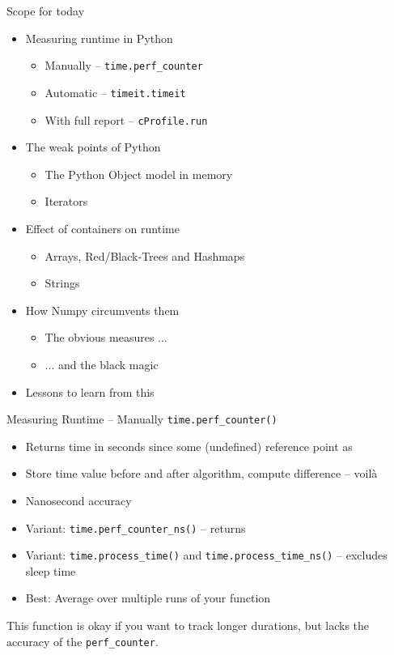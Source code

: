 \begin{frame}{Scope for today}
%
\begin{itemize}
\item Measuring runtime in Python
	\begin{itemize}
	\item Manually -- \texttt{time.perf\_counter}
	\item Automatic -- \texttt{timeit.timeit}
	\item With full report -- \texttt{cProfile.run}
	\end{itemize}
\item The weak points of Python
	\begin{itemize}
	\item The Python Object model in memory
	\item Iterators
	\end{itemize}
\item Effect of containers on runtime
	\begin{itemize}
	\item Arrays, Red/Black-Trees and Hashmaps
	\item Strings
	\end{itemize}
\item How Numpy circumvents them
	\begin{itemize}
	\item The obvious measures ...
	\item ... and the black magic
	\end{itemize}
\item Lessons to learn from this
\end{itemize}
%
\end{frame}


\begin{frame}{Measuring Runtime -- Manually}
%
\texttt{time.perf\_counter()}
\begin{itemize}
\item Returns time in seconds since some (undefined) reference point as 
\item Store time value before and after algorithm, compute difference -- voilà
\item Nanosecond accuracy
\item Variant: \texttt{time.perf\_counter\_ns()} -- returns 
\item Variant: \texttt{time.process\_time()} and \texttt{time.process\_time\_ns()} -- excludes sleep time
\item Best: Average over multiple runs of your function
\end{itemize}
%
\begin{warnbox}
\footnotesize
This function is okay if you want to track longer durations, but lacks the accuracy of the \texttt{perf\_counter}.
\end{warnbox}
%
\end{frame}

